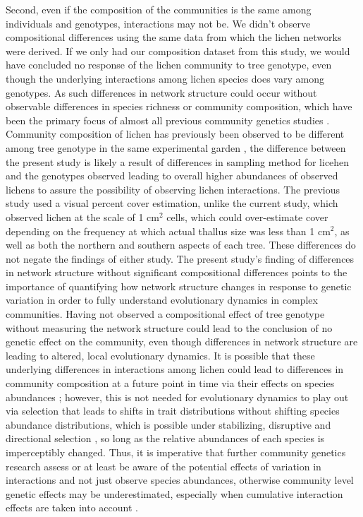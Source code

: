 \documentclass[fleqn,12pt]{olplainarticle}
\begin{document}
Second, even if the composition of the communities is the same among
individuals and genotypes, interactions may not be. We didn't observe
compositional differences using the same data from which the lichen
networks were derived. If we only had our composition dataset from
this study, we would have concluded no response of the lichen
community to tree genotype, even though the underlying interactions
among lichen species does vary among genotypes. As such differences in
network structure could occur without observable differences in
species richness or community composition, which have been the primary
focus of almost all previous community genetics studies
\citep{DesRoches2018TheVariation}. Community composition of lichen has
previously been observed to be different among tree genotype in the
same experimental garden \citep{Lamit2011, Lamit2015a}, the difference
between the present study is likely a result of differences in
sampling method for licehen and the genotypes observed leading to
overall higher abundances of observed lichens to assure the
possibility of observing lichen interactions. The previous study used
a visual percent cover estimation, unlike the current study, which
observed lichen at the scale of 1 cm$^2$ cells, which could
over-estimate cover depending on the frequency at which actual thallus
size was less than 1 cm$^2$, as well as both the northern and southern
aspects of each tree. These differences do not negate the findings of
either study. The present study's finding of differences in network
structure without significant compositional differences points to the
importance of quantifying how network structure changes in response to
genetic variation in order to fully understand evolutionary dynamics
in complex communities. Having not observed a compositional effect of
tree genotype without measuring the network structure could lead to
the conclusion of no genetic effect on the community, even though
differences in network structure are leading to altered, local
evolutionary dynamics. It is possible that these underlying
differences in interactions among lichen could lead to differences in
community composition at a future point in time via their effects on
species abundances \citep{Shuster2006COMMUNITYSTRUCTURE}; however,
this is not needed for evolutionary dynamics to play out via selection
that leads to shifts in trait distributions without shifting species
abundance distributions, which is possible under stabilizing,
disruptive and directional selection \citep{Conner2004ATextbook}, so
long as the relative abundances of each species is imperceptibly
changed. Thus, it is imperative that further community genetics
research assess or at least be aware of the potential effects of
variation in interactions and not just observe species abundances,
otherwise community level genetic effects may be underestimated,
especially when cumulative interaction effects are taken into account
\citep{Borrett2007FunctionalProliferation}.
\end{document}
